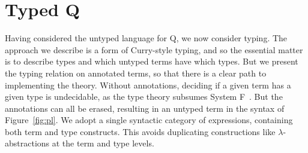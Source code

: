 \documentclass{article}
\begin{document}
\section{Typed Q}

Having considered the untyped language for Q, we now consider typing.  The approach we describe
is a form of Curry-style typing, and so the essential matter is to describe types and which
untyped terms have which types.  But we present the typing relation on annotated terms, so
that there is a clear path to implementing the theory.  Without annotations, deciding if a
given term has a given type is undecidable, as the type theory subsumes System F~\cite{wells99}.
But the annotations can all be erased, resulting in an untyped term in the syntax of Figure~\ref{fig:pl}.
We adopt a single syntactic category of expressions, containing both term and type constructs.
This avoids duplicating constructions like $\lambda$-abstractions at the term and type levels.
\end{document}
